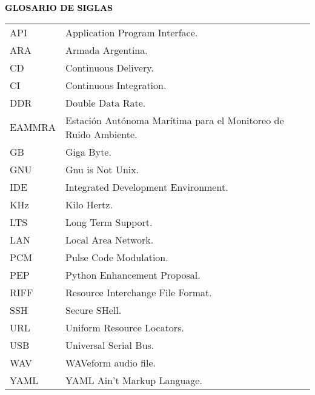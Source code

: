 
\begin{center}
	\Large\textbf{{\textcolor{black}{GLOSARIO DE SIGLAS}}}
\end{center}
\begin{tabular}{l p{12cm}}
	API		&Application Program Interface.\\		
	ARA		&Armada Argentina.\\
	CD		&Continuous Delivery.\\
	CI		&Continuous Integration.\\
	DDR		&Double Data Rate.\\
	EAMMRA	&Estación Autónoma Marítima para el Monitoreo de Ruido Ambiente.\\
	GB		&Giga Byte.\\	
	GNU		&Gnu is Not Unix.\\
	IDE		&Integrated Development Environment.\\
	KHz		&Kilo Hertz.\\
	LTS		&Long Term Support.\\
	LAN		&Local Area Network.\\
	PCM		&Pulse Code Modulation.\\	
	PEP		&Python Enhancement Proposal.\\
	RIFF	&Resource Interchange File Format.\\
	SSH		&Secure SHell.\\	
	URL		&Uniform Resource Locators.\\
	USB		&Universal Serial Bus.\\
	WAV		&WAVeform audio file.\\
	YAML	&YAML Ain't Markup Language.\\
\end{tabular}

\clearpage
